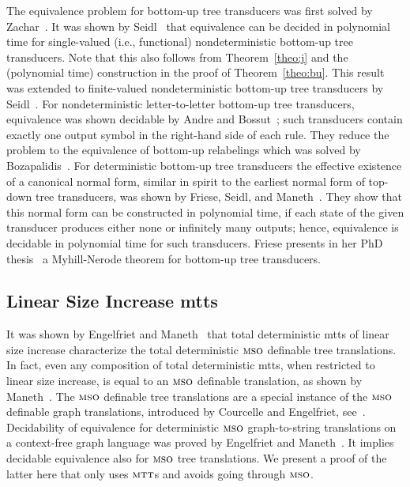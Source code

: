 \documentclass[copyright,creativecommons]{eptcs}
\newcommand{\mtt}{\textsc{mtt}}
\newcommand{\mso}{\textsc{mso}}
\begin{document}
The equivalence problem for bottom-up tree transducers was first solved
by Zachar~\cite{DBLP:journals/actaC/Zachar80}.
It was shown by Seidl~\cite{DBLP:journals/tcs/Seidl92} 
that equivalence can be decided in polynomial time for
single-valued (i.e., functional) nondeterministic bottom-up tree transducers. 
Note that this also follows from Theorem~\ref{theo:j} and the (polynomial time)
construction in the proof of Theorem~\ref{theo:bu}.
This result was extended to finite-valued nondeterministic bottom-up
tree transducers by Seidl~\cite{DBLP:journals/mst/Seidl94}.
For nondeterministic letter-to-letter bottom-up tree transducers, equivalence
was shown decidable by Andre and Bossut~\cite{DBLP:conf/tapsoft/AndreB95};
such transducers contain exactly one output symbol in the right-hand side
of each rule.
They reduce the problem to the equivalence of bottom-up relabelings which
was solved by Bozapalidis~\cite{DBLP:journals/tcs/Bozapalidis92}.
For deterministic bottom-up tree transducers the effective existence of a
canonical normal form, similar in spirit to the earliest normal
form of top-down tree transducers, was shown by Friese, Seidl, 
and Maneth~\cite{DBLP:journals/ijfcs/FrieseSM11}. They show that this normal
form can be constructed in polynomial time, if each state of the given
transducer produces either none or infinitely many outputs; hence, 
equivalence is decidable in polynomial time for such transducers.
Friese presents in her PhD thesis~\cite{Friese10Thesis} a Myhill-Nerode theorem
for bottom-up tree transducers.

\subsection{Linear Size Increase mtts}

It was shown by Engelfriet and Maneth~\cite{DBLP:journals/siamcomp/EngelfrietM03}
that total deterministic mtts of linear size increase 
characterize the total deterministic
$\mso$ definable tree translations. In fact, even any composition of total deterministic
mtts, when restricted to linear size increase, is equal to an $\mso$ definable translation,
as shown by Maneth~\cite{DBLP:conf/fsttcs/Maneth03}.
The $\mso$ definable tree translations are a special instance of the
$\mso$ definable graph translations, introduced by Courcelle and
Engelfriet, see~\cite{DBLP:books/daglib/0030804}.
Decidability of equivalence for deterministic $\mso$ graph-to-string translations 
on a context-free graph language was proved by Engelfriet and Maneth~\cite{DBLP:journals/ipl/EngelfrietM06}.
It implies decidable equivalence also for $\mso$ tree translations.
We present a proof of the latter here that only uses $\mtt$s and avoids going through $\mso$. 
\end{document}
